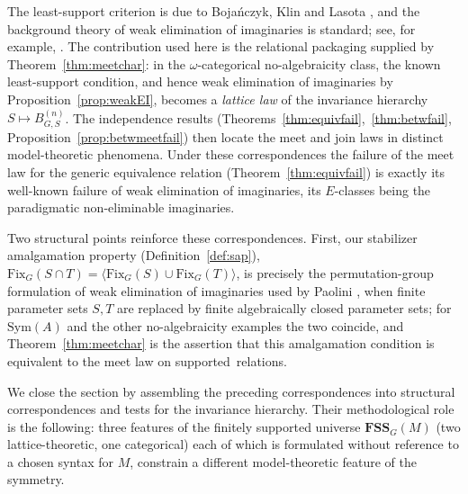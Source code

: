 \documentclass{lmcs}
\newcommand{\Sym}{\mathrm{Sym}}
\newcommand{\Fix}{\mathrm{Fix}}
\newcommand{\FSS}{\mathbf{FSS}}
\begin{document}
\begin{rem}\label{rem:weakEIcredit}
The least-support criterion is due to Boja\'nczyk, Klin and Lasota
\cite{BKL14}, and the background theory of weak elimination of imaginaries
is standard; see, for example, \cite{CasanovasFarre}. The contribution used
here is the relational packaging supplied by Theorem~\ref{thm:meetchar}: in the $\omega$-categorical no-algebraicity class, the known least-support condition, and hence weak elimination of imaginaries by Proposition~\ref{prop:weakEI}, becomes a \emph{lattice law} of the invariance hierarchy $S\mapsto B^{(n)}_{G,S}$. The independence results (Theorems~\ref{thm:equivfail},~\ref{thm:betwfail}, Proposition~\ref{prop:betwmeetfail}) then locate the meet and join laws in distinct model-theoretic phenomena. Under these correspondences the failure of the meet law for the generic equivalence relation (Theorem~\ref{thm:equivfail}) is exactly its well-known failure of weak elimination of imaginaries, its $E$-classes being the paradigmatic non-eliminable imaginaries.

Two structural points reinforce these correspondences. First, our
stabilizer amalgamation property (Definition~\ref{def:sap}),
$\Fix_G(S\cap T)=\langle\Fix_G(S)\cup\Fix_G(T)\rangle$, is precisely
the permutation-group formulation of weak elimination of imaginaries
used by Paolini \cite{Paolini24}, when finite parameter sets $S,T$ are replaced by finite
algebraically closed parameter sets; for $\Sym(A)$ and the other
no-algebraicity examples the two coincide, and
Theorem~\ref{thm:meetchar} is the assertion that this amalgamation
condition is equivalent to the meet law on supported~relations.
\end{rem}

We close the section by assembling the preceding correspondences into
structural correspondences and tests for the invariance hierarchy.
Their methodological role is the following: three features of the finitely supported universe $\FSS_G(M)$ (two lattice-theoretic, one categorical) each of which is formulated without reference to a chosen syntax for $M$, constrain a different model-theoretic feature of the symmetry.
\end{document}
